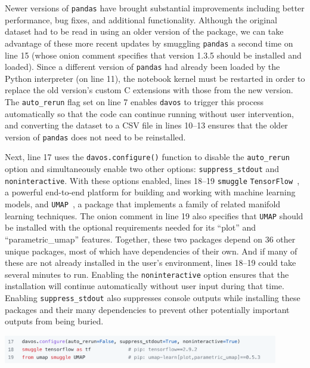 \documentclass[preprint,12pt,a4paper]{elsarticle}
\begin{document}
Newer versions of \texttt{pandas} have brought substantial
improvements including better performance, bug fixes, and additional functionality.
Although the original dataset had to be read in using an older version
of the package, we can take advantage of these more recent updates
by smuggling \texttt{pandas} a second time on line 15 (whose onion comment
specifies that version 1.3.5 should be installed and loaded).  Since
a different version of \texttt{pandas} had already been loaded by the Python interpreter
(on line 11), the notebook kernel must be restarted in order to replace the old
version's custom C extensions with those from the new version.  The \texttt{auto\_rerun} flag
set on line 7 enables \texttt{davos} to trigger this process automatically so that
the code can continue running without user intervention, and converting
the dataset to a CSV file in lines 10--13 ensures that
the older version of \texttt{pandas} does not need to be reinstalled.

Next, line 17 uses the \texttt{davos.configure()} function to disable
the \texttt{auto\_rerun} option and simultaneously enable two other
options: \texttt{suppress\_stdout} and \texttt{noninteractive}. With
these options enabled, lines 18--19 \texttt{smuggle}
\texttt{TensorFlow}~\cite{AbadEtal15}, a powerful end-to-end platform
for building and working with machine learning models, and
\texttt{UMAP}~\cite{McInEtal18b}, a package that implements a family
of related manifold learning techniques. The onion comment in line 19
also specifies that \texttt{UMAP} should be installed with the
optional requirements needed for its ``plot'' and ``parametric\_umap''
features. Together, these two packages depend on 36 other unique
packages, most of which have dependencies of their own. And if many of
these are not already installed in the user's environment, lines
18--19 could take several minutes to run.  Enabling the
\texttt{noninteractive} option ensures that the installation will
continue automatically without user input during that time.  Enabling
\texttt{suppress\_stdout} also suppresses console outputs while installing
these packages and their many dependencies to prevent other potentially important outputs from being buried.
\begin{center}
\includegraphics[width=0.9\textwidth]{figs/example4}
\end{center}
\end{document}
